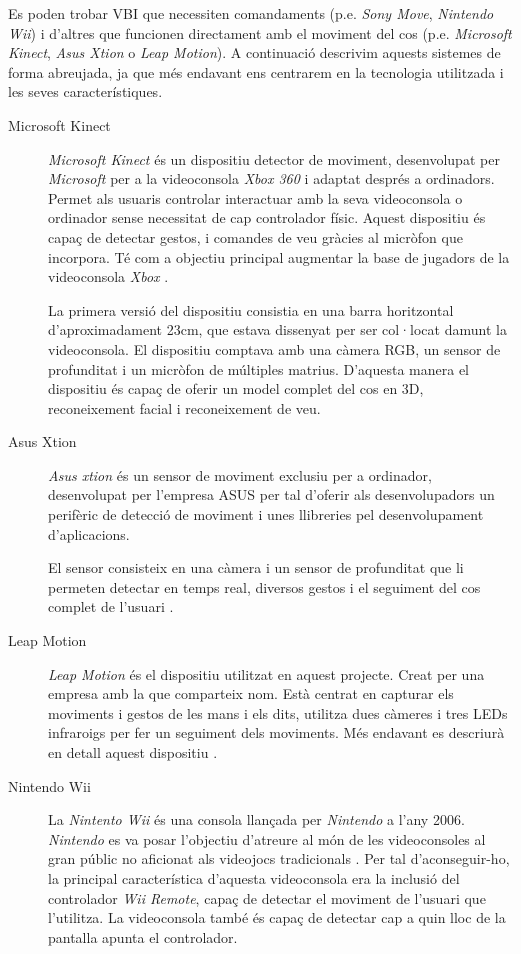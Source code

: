 \documentclass[12pt,a4paper,catalan]{article}
\begin{document}
	Es poden trobar VBI que necessiten comandaments (p.e. \textit{Sony Move}, \textit{Nintendo Wii}) i d'altres que funcionen directament amb el moviment del cos (p.e. \textit{Microsoft Kinect}, \textit{Asus Xtion} o \textit{Leap Motion}). A continuació descrivim aquests sistemes de forma abreujada, ja que més endavant ens centrarem en la tecnologia utilitzada i les seves característiques.
	\begin{description}
		\item[Microsoft Kinect] \textit{Microsoft Kinect} és un dispositiu detector de moviment, desenvolupat per \textit{Microsoft} per a la videoconsola \textit{Xbox 360} i adaptat després a ordinadors. Permet als usuaris controlar interactuar amb la seva videoconsola o ordinador sense necessitat de cap controlador físic. Aquest dispositiu és capaç de detectar gestos, i comandes de veu gràcies al micròfon que incorpora. Té com a objectiu principal augmentar la base de jugadors de la videoconsola \textit{Xbox} \cite{kinect-e3}.
		
		La primera versió del dispositiu consistia en una barra horitzontal d'aproximadament 23cm, que estava dissenyat per ser col·locat damunt la videoconsola. El dispositiu comptava amb una càmera RGB, un sensor de profunditat i un micròfon de múltiples matrius. D'aquesta manera el dispositiu és capaç de oferir un model complet del cos en 3D, reconeixement facial i reconeixement de veu.
		\item[Asus Xtion] \textit{Asus xtion} és un sensor de moviment exclusiu per a ordinador, desenvolupat per l'empresa ASUS per tal d'oferir als desenvolupadors un perifèric de detecció de moviment i unes llibreries pel desenvolupament d'aplicacions.
		
		El sensor consisteix en una càmera i un sensor de profunditat que li permeten detectar en temps real, diversos gestos i el seguiment del cos complet de l'usuari \cite{xtion}.
		\item[Leap Motion] \textit{Leap Motion} és el dispositiu utilitzat en aquest projecte. Creat per una empresa amb la que comparteix nom. Està centrat en capturar els moviments i gestos de les mans i els dits, utilitza dues càmeres i tres LEDs infraroigs per fer un seguiment dels moviments. Més endavant es descriurà en detall aquest dispositiu \cite{how-leap-works}.
		\item[Nintendo Wii] La \textit{Nintento Wii} és una consola llançada per \textit{Nintendo} a l'any 2006. \textit{Nintendo} es va posar l'objectiu d'atreure al món de les videoconsoles al gran públic no aficionat als videojocs tradicionals \cite{wii}. Per tal d'aconseguir-ho, la principal característica d'aquesta videoconsola era la inclusió del controlador \textit{Wii Remote}, capaç de detectar el moviment de l'usuari que l'utilitza. La videoconsola també és capaç de detectar cap a quin lloc de la pantalla apunta el controlador.
		

\end{description}
\end{document}
